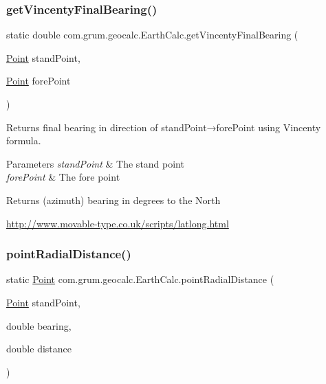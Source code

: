 \subsubsection{\texorpdfstring{get\+Vincenty\+Final\+Bearing()}{getVincentyFinalBearing()}}
{\footnotesize\ttfamily static double com.\+grum.\+geocalc.\+Earth\+Calc.\+get\+Vincenty\+Final\+Bearing (\begin{DoxyParamCaption}\item[{\mbox{\hyperlink{classcom_1_1grum_1_1geocalc_1_1_point}{Point}}}]{stand\+Point,  }\item[{\mbox{\hyperlink{classcom_1_1grum_1_1geocalc_1_1_point}{Point}}}]{fore\+Point }\end{DoxyParamCaption})\hspace{0.3cm}{\ttfamily [static]}}

Returns final bearing in direction of stand\+Point→fore\+Point using Vincenty formula.


\begin{DoxyParams}{Parameters}
{\em stand\+Point} & The stand point \\
\hline
{\em fore\+Point} & The fore point \\
\hline
\end{DoxyParams}
\begin{DoxyReturn}{Returns}
(azimuth) bearing in degrees to the North
\end{DoxyReturn}
\mbox{\hyperlink{}{http\+://www.\+movable-\/type.\+co.\+uk/scripts/latlong.\+html}}\mbox{\label{classcom_1_1grum_1_1geocalc_1_1_earth_calc_a7c82be3d4244006e9b3f7a0c7f2b6be9}} 
\subsubsection{\texorpdfstring{point\+Radial\+Distance()}{pointRadialDistance()}}
{\footnotesize\ttfamily static \mbox{\hyperlink{classcom_1_1grum_1_1geocalc_1_1_point}{Point}} com.\+grum.\+geocalc.\+Earth\+Calc.\+point\+Radial\+Distance (\begin{DoxyParamCaption}\item[{\mbox{\hyperlink{classcom_1_1grum_1_1geocalc_1_1_point}{Point}}}]{stand\+Point,  }\item[{double}]{bearing,  }\item[{double}]{distance }\end{DoxyParamCaption})\hspace{0.3cm}{\ttfamily [static]}}


